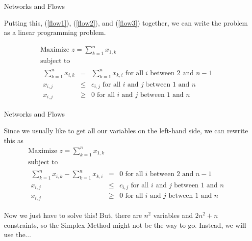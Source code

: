 \begin{frame}[fragile]{Networks and Flows}


Putting this, (\ref{flow1}), (\ref{flow2}), and (\ref{flow3}) together, we can write the problem as a linear programming problem.

$$
\begin{array}{l}
\mbox{Maximize $z=\sum_{k=1}^n x_{1,k}$}\\
\mbox{subject to}\\
\begin{array}{rcl}
\sum_{k=1}^n x_{i,k}&=&\sum_{k=1}^n x_{k,i}\mbox{ for all $i$ between $2$ and $n-1$}\\
x_{i,j}&\le&c_{i,j}\mbox{ for all $i$ and $j$ between $1$ and $n$}\\
x_{i,j}&\ge&0\mbox{ for all $i$ and $j$ between $1$ and $n$}
\end{array}
\end{array}
$$

\end{frame}
\begin{frame}[fragile]{Networks and Flows}

Since we usually like to get all our variables on the left-hand side, we can rewrite this as
$$
\begin{array}{l}
\mbox{Maximize $z=\sum_{k=1}^n x_{1,k}$}\\
\mbox{subject to}\\
\begin{array}{rcl}
\sum_{k=1}^n x_{i,k}-\sum_{k=1}^n x_{k,i}&=&0\mbox{ for all $i$ between $2$ and $n-1$}\\
x_{i,j}&\le&c_{i,j}\mbox{ for all $i$ and $j$ between $1$ and $n$}\\
x_{i,j}&\ge&0\mbox{ for all $i$ and $j$ between $1$ and $n$}
\end{array}
\end{array}
$$

Now we just have to solve this!  But, there are $n^2$ variables and $2n^2+n$ constraints, so the Simplex Method might not be the way to go.  Instead, we will use the...

\end{frame}
